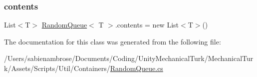 \subsubsection{\texorpdfstring{contents}{contents}}
{\footnotesize\ttfamily List$<$T$>$ \mbox{\hyperlink{class_random_queue}{Random\+Queue}}$<$ T $>$.contents = new List$<$T$>$()\hspace{0.3cm}{\ttfamily [protected]}}



The documentation for this class was generated from the following file\+:\begin{DoxyCompactItemize}
\item 
/\+Users/sabienambrose/\+Documents/\+Coding/\+Unity\+Mechanical\+Turk/\+Mechanical\+Turk/\+Assets/\+Scripts/\+Util/\+Containers/\mbox{\hyperlink{_random_queue_8cs}{Random\+Queue.\+cs}}\end{DoxyCompactItemize}
